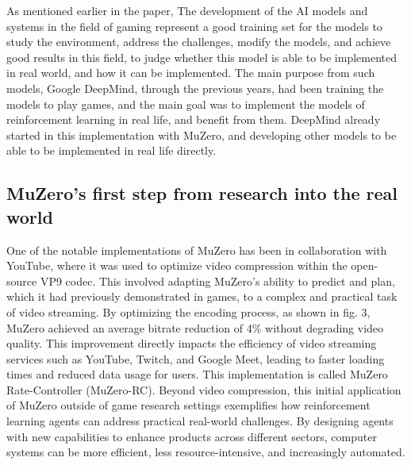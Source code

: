As mentioned earlier in the paper, The development of the AI models and systems
in the field of gaming represent a good training set for the models to study
the environment, address the challenges, modify the models, and achieve good
results in this field, to judge whether this model is able to be implemented in
real world, and how it can be implemented. The main purpose from such models,
Google DeepMind, through the previous years, had been training the models to
play games, and the main goal was to implement the models of reinforcement
learning in real life, and benefit from them. DeepMind already started in this
implementation with MuZero, and developing other models to be able to be
implemented in real life directly.
\subsection*{MuZero's first step from research into the real world}
One of the notable implementations of MuZero has been in collaboration with
YouTube, where it was used to optimize video compression within the open-source
VP9 codec. This involved adapting MuZero's ability to predict and plan, which
it had previously demonstrated in games, to a complex and practical task of
video streaming. By optimizing the encoding process, as shown in fig. 3, MuZero
achieved an average bitrate reduction of 4\% without degrading video
quality\cite{FD1}. This improvement directly impacts the efficiency of video
streaming services such as YouTube, Twitch, and Google Meet, leading to faster
loading times and reduced data usage for users. This implementation is called
MuZero Rate-Controller (MuZero-RC). Beyond video compression, this initial
application of MuZero outside of game research settings exemplifies how
reinforcement learning agents can address practical real-world challenges. By
designing agents with new capabilities to enhance products across different
sectors, computer systems can be more efficient, less resource-intensive, and
increasingly automated\cite{FD1}.
